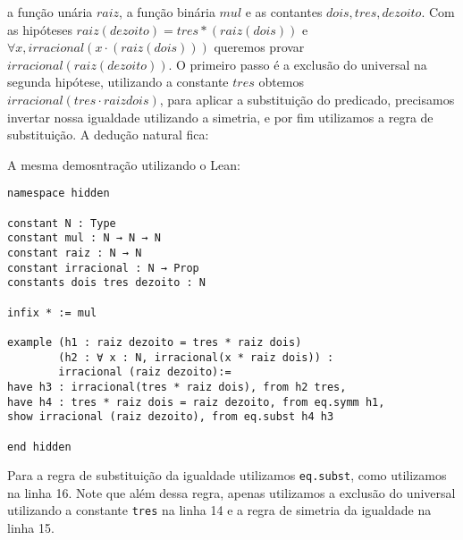 a função unária $raiz$, a função binária $mul$ e as contantes $dois, tres, dezoito$. Com as hipóteses 
$raiz (dezoito) = tres*(raiz(dois))$ e $\forall x, irracional(x \cdot (raiz (dois)))$ queremos provar $irracional(raiz (dezoito))$. O primeiro
passo é a exclusão do universal na segunda hipótese, utilizando a constante $tres$ obtemos $irracional (tres \cdot raiz dois)$,
para aplicar a substituição do predicado, precisamos invertar nossa igualdade utilizando a simetria, e por 
fim utilizamos a regra de substituição. A dedução natural fica:
\begin{center}
    \begin{bprooftree}
    \end{bprooftree}
\end{center}
A mesma demosntração utilizando o Lean:
\begin{lstlisting}
namespace hidden

constant N : Type
constant mul : N → N → N
constant raiz : N → N
constant irracional : N → Prop
constants dois tres dezoito : N

infix * := mul

example (h1 : raiz dezoito = tres * raiz dois)
        (h2 : ∀ x : N, irracional(x * raiz dois)) :
        irracional (raiz dezoito):=
have h3 : irracional(tres * raiz dois), from h2 tres,
have h4 : tres * raiz dois = raiz dezoito, from eq.symm h1,
show irracional (raiz dezoito), from eq.subst h4 h3

end hidden
\end{lstlisting}
Para a regra de substituição da igualdade utilizamos \lstinline{eq.subst}, como utilizamos na linha 16.
Note que além dessa regra, apenas utilizamos a exclusão do universal utilizando a constante \lstinline{tres}
na linha 14 e a regra de simetria da igualdade na linha 15.
